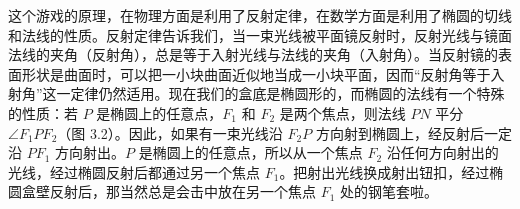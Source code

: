 这个游戏的原理，在物理方面是利用了反射定律，在数学方面是利用了椭圆的切线和法线的性质。反射定律告诉我们，当一束光线被平面镜反射时，反射光线与镜面法线的夹角（反射角），总是等于入射光线与法线的夹角（入射角）。当反射镜的表面形状是曲面时，可以把一小块曲面近似地当成一小块平面，因而“反射角等于入射角”这一定律仍然适用。现在我们的盒底是椭圆形的，而椭圆的法线有一个特殊的性质：若 $P$ 是椭圆上的任意点，$F_1$ 和 $F_2$ 是两个焦点，则法线 $PN$ 平分 $\angle F_1PF_2$（图 3.2）。因此，如果有一束光线沿 $F_2P$ 方向射到椭圆上，经反射后一定沿 $PF_1$ 方向射出。$P$ 是椭圆上的任意点，所以从一个焦点 $F_2$ 沿任何方向射出的光线，经过椭圆反射后都通过另一个焦点 $F_1$。把射出光线换成射出钮扣，经过椭圆盒壁反射后，那当然总是会击中放在另一个焦点 $F_1$ 处的钢笔套啦。
